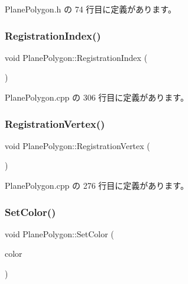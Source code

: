  Plane\+Polygon.\+h の 74 行目に定義があります。

\mbox{\label{class_plane_polygon_a535d0222908f4a4a030d8b525b225554}} 
\subsubsection{\texorpdfstring{Registration\+Index()}{RegistrationIndex()}}
{\footnotesize\ttfamily void Plane\+Polygon\+::\+Registration\+Index (\begin{DoxyParamCaption}{ }\end{DoxyParamCaption})\hspace{0.3cm}{\ttfamily [private]}}



 Plane\+Polygon.\+cpp の 306 行目に定義があります。

\mbox{\label{class_plane_polygon_af4ba95cfaf0aba506eeb58cdc80bfd46}} 
\subsubsection{\texorpdfstring{Registration\+Vertex()}{RegistrationVertex()}}
{\footnotesize\ttfamily void Plane\+Polygon\+::\+Registration\+Vertex (\begin{DoxyParamCaption}{ }\end{DoxyParamCaption})\hspace{0.3cm}{\ttfamily [private]}}



 Plane\+Polygon.\+cpp の 276 行目に定義があります。

\mbox{\label{class_plane_polygon_a55307fc341641d7fd42fe2269acbd113}} 
\subsubsection{\texorpdfstring{Set\+Color()}{SetColor()}}
{\footnotesize\ttfamily void Plane\+Polygon\+::\+Set\+Color (\begin{DoxyParamCaption}\item[{\mbox{\hyperlink{_vector3_d_8h_a680c30c4a07d86fe763c7e01169cd6cc}{X\+Color4}}}]{color }\end{DoxyParamCaption})}



